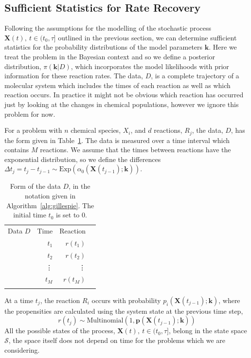 \documentclass[final]{siamltex}
\begin{document}

\subsection{Sufficient Statistics for Rate Recovery}

Following the assumptions for the modelling of the stochastic process $\mathbf{X}(t),\ t \in (t_0, \tau]$ outlined in the previous section, we can determine sufficient statistics for the probability distributions of the model parameters $\mathbf{k}$. Here we treat the problem in the Bayesian context and so we define a posterior distribution, $\pi(\mathbf{k}|D)$, which incorporates the model likelihoods with prior information for these reaction rates. The data, $D$, is a complete trajectory of a molecular system which includes the times of each reaction as well as which reaction occurs. In practice it might not be obvious which reaction has occurred just by looking at the changes in chemical populations, however we ignore this problem for now.

For a problem with $n$ chemical species, $X_i$,  and $d$ reactions, $R_j$, the data, $D$, has the form given in Table~\ref{tab:chem_data}. The data is measured over a time interval which contains $M$ reactions. We assume that the times between reactions have the exponential distribution, so we define the differences $\Delta t_j = t_{j}-t_{j-1} \sim \text{Exp}\left(\alpha_0(\mathbf{X}(t_{j-1});\mathbf{k})\right)$.

\begin{table}[!h]
\centering
\begin{tabular}{l|r|r|r|}
	\hhline{~|--|}
	Data $D$ \quad & Time & Reaction \\ \hhline{~|=|=|}
	& $t_1$	& $r(t_1)$ \\
	& $t_2$	& $r(t_2)$ \\
	& \vdots & \vdots \\
	& $t_M$	& $r(t_M)$ \\ \hhline{~|--|}
 \end{tabular}
\caption{Form of the data $D$, in the notation given in Algorithm~\ref{alg:gillespie}. The initial time $t_0$ is set to 0.}
\label{tab:chem_data}
\end{table}

At a time $t_j$, the reaction $R_i$ occurs with probability $p_i(\mathbf{X}(t_{j-1});\mathbf{k})$, where the propensities are calculated using the system state at the previous time step,
\[
	r(t_j) \sim \text{Multinomial}\left(1, \mathbf{p}(\mathbf{X}(t_{j-1});\mathbf{k})\right)
\]
All the possible states of the process, $\mathbf{X}(t),\ t \in (t_0,\tau]$, belong in the state space $\mathcal{S}$, the space itself does not depend on time for the problems which we are considering.
\end{document}
